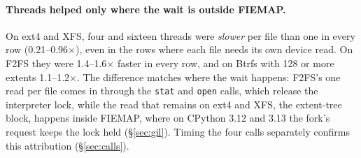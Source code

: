 \paragraph{Threads helped only where the wait is outside FIEMAP.} On ext4 and XFS,
four and sixteen threads were \emph{slower} per file than one in every row
(0.21--0.96$\times$), even in the rows where each file needs its own device read. On
F2FS they were 1.4--1.6$\times$ faster in every row, and on Btrfs with 128 or more
extents 1.1--1.2$\times$. The difference matches where the wait happens: F2FS's one
read per file comes in through the \texttt{stat} and \texttt{open} calls, which release
the interpreter lock, while the read that remains on ext4 and XFS, the extent-tree
block, happens inside FIEMAP, where on CPython 3.12 and 3.13 the fork's request keeps
the lock held (\S\ref{sec:gil}). Timing the four calls separately confirms this
attribution (\S\ref{sec:calls}).
